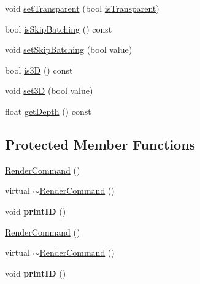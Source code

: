 \begin{DoxyCompactItemize}
\item 
void \hyperlink{classRenderCommand_ae0e5114be31f9898e6b43d212f0682c7}{set\+Transparent} (bool \hyperlink{classRenderCommand_ae1fd8d457e581f0dc5bd7ba1f713f815}{is\+Transparent})
\item 
bool \hyperlink{classRenderCommand_a365205f076e44d2d88f2e1e3ef19fddf}{is\+Skip\+Batching} () const
\item 
void \hyperlink{classRenderCommand_ae44204f67966be88c29cfdd568471704}{set\+Skip\+Batching} (bool value)
\item 
bool \hyperlink{classRenderCommand_a25ba2f4afa64eebd1433f8ba35c048d0}{is3D} () const
\item 
void \hyperlink{classRenderCommand_a2f19b23dcc4fa705c4af932df41c5606}{set3D} (bool value)
\item 
float \hyperlink{classRenderCommand_af3fb4b32d8dbc7fd216e15f75f31e75c}{get\+Depth} () const
\end{DoxyCompactItemize}
\subsection*{Protected Member Functions}
\begin{DoxyCompactItemize}
\item 
\hyperlink{classRenderCommand_af35c38b469dc3b4d285cde60d0ea5ab3}{Render\+Command} ()
\item 
virtual \hyperlink{classRenderCommand_a44e483607bb9cf9f67c579ba467920c9}{$\sim$\+Render\+Command} ()
\item 
\mbox{\label{classRenderCommand_ac33351337576455c0191a2a5cf7c18b4}} 
void {\bfseries print\+ID} ()
\item 
\hyperlink{classRenderCommand_af12021a0064de4456d18797d24618dc7}{Render\+Command} ()
\item 
virtual \hyperlink{classRenderCommand_aa2d2dd74db7c62313cd1a264b59bf093}{$\sim$\+Render\+Command} ()
\item 
\mbox{\label{classRenderCommand_ac33351337576455c0191a2a5cf7c18b4}} 
void {\bfseries print\+ID} ()
\end{DoxyCompactItemize}

